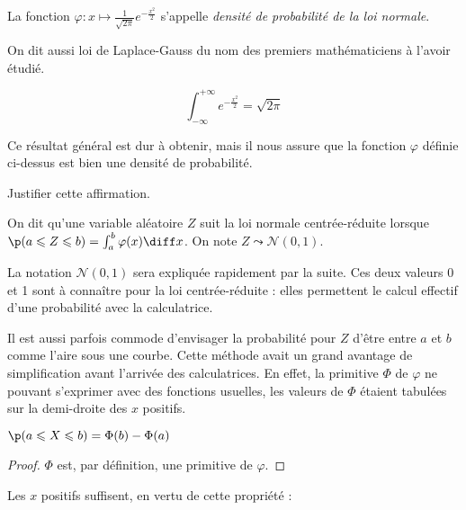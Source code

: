 \documentclass[11pt,a4paper,french]{article}
\begin{document}
\begin{definition}
  La fonction $\varphi : x\mapsto \frac1{\sqrt{2\pi}}e^{-\frac{x^2}2}$
  s'appelle \emph{densité de probabilité de la loi normale}.
\end{definition}

On dit aussi loi de Laplace-Gauss du nom des premiers mathématiciens à
l'avoir étudié.

\begin{proposition}[admise]
  \[ \int_{-\infty}^{+\infty} e^{-\frac{x^2}2} = \sqrt{2\pi} \]
\end{proposition}

Ce résultat général est dur à obtenir, mais il nous assure que la
fonction $\varphi$ définie ci-dessus est bien une densité de
probabilité.

\begin{question}
  Justifier cette affirmation.
\end{question}

\begin{definition}
  On dit qu'une variable aléatoire $Z$ suit la loi normale
  centrée-réduite lorsque $\p(a\leqslant Z \leqslant b) = \int_a^b
  \varphi(x)\diff x$. On note $Z \leadsto \mathcal{N}(0,1)$.
\end{definition}

\begin{remarque} La notation $\mathcal{N}(0,1)$ sera expliquée
  rapidement par la suite. Ces deux valeurs 0 et 1 sont à connaître pour
  la loi centrée-réduite : elles permettent le calcul effectif d'une
  probabilité avec la calculatrice.
\end{remarque}

Il est aussi parfois commode d'envisager la probabilité pour $Z$ d'être
entre $a$ et $b$ comme l'aire sous une courbe. Cette méthode avait un
grand avantage de simplification avant l'arrivée des calculatrices. En
effet, la primitive $\Phi$ de $\varphi$ ne pouvant s'exprimer avec des
fonctions usuelles, les valeurs de $\Phi$ étaient tabulées sur la
demi-droite des $x$ positifs.

\begin{proposition}
  $\p(a \leqslant X \leqslant b) = \Phi(b) - \Phi(a)$
\end{proposition}
\begin{proof}
  $\Phi$ est, par définition, une primitive de $\varphi$.
\end{proof}

Les $x$ positifs suffisent, en vertu de cette propriété :
\end{document}
